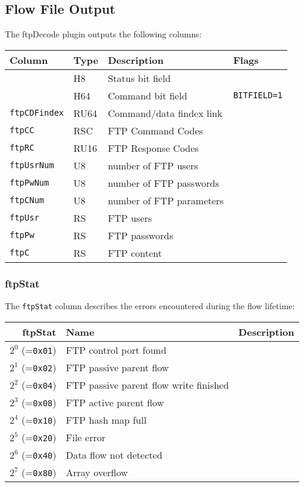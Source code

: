 \documentclass[documentation]{subfiles}
\begin{document}
\subsection{Flow File Output}
The ftpDecode plugin outputs the following columns:
\begin{longtable}{llll}
    \toprule
    {\bf Column} & {\bf Type} & {\bf Description} & {\bf Flags}\\
    \midrule\endhead%
    {\tt \nameref{ftpStat}} &  H8  & Status bit field\\
    {\tt \nameref{ftpCBF}}  &  H64 & Command bit field & {\tt BITFIELD=1}\\
    {\tt ftpCDFindex}       & RU64 & Command/data findex link\\
    {\tt ftpCC}             & RSC  & FTP Command Codes \\
    {\tt ftpRC}             & RU16 & FTP Response Codes \\
    {\tt ftpUsrNum}         &  U8  & number of FTP users \\
    {\tt ftpPwNum}          &  U8  & number of FTP passwords \\
    {\tt ftpCNum}           &  U8  & number of FTP parameters \\
    {\tt ftpUsr}            & RS   & FTP users \\
    {\tt ftpPw}             & RS   & FTP passwords \\
    {\tt ftpC}              & RS   & FTP content \\
    \bottomrule
\end{longtable}

\subsubsection{ftpStat}\label{ftpStat}
The {\tt ftpStat} column describes the errors encountered during the flow lifetime:
\begin{longtable}{rll}
    \toprule
    {\bf ftpStat} & {\bf Name} & {\bf Description}\\
    \midrule\endhead%
    $2^0$ (={\tt 0x01}) & FTP control port found\\
    $2^1$ (={\tt 0x02}) & FTP passive parent flow\\
    $2^2$ (={\tt 0x04}) & FTP passive parent flow write finished\\
    $2^3$ (={\tt 0x08}) & FTP active parent flow\\
    $2^4$ (={\tt 0x10}) & FTP hash map full \\
    $2^5$ (={\tt 0x20}) & File error\\
    $2^6$ (={\tt 0x40}) & Data flow not detected\\
    $2^7$ (={\tt 0x80}) & Array overflow\\
    \bottomrule
\end{longtable}
\end{document}
